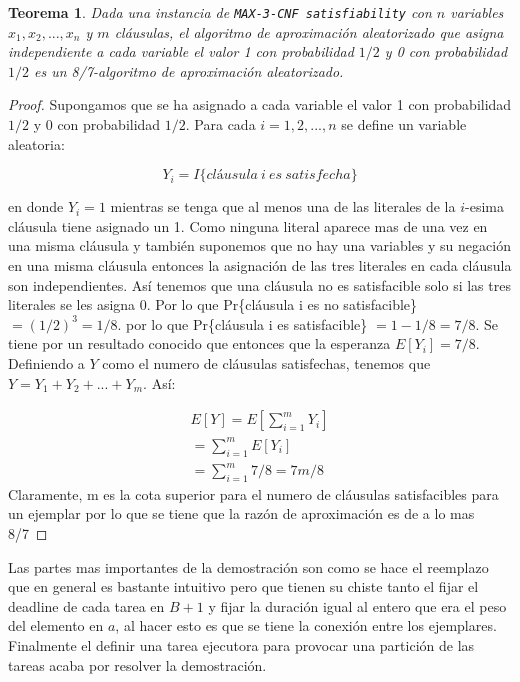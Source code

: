 \documentclass{article}
\newtheorem{theorem}{Teorema}
\begin{document}
\begin{theorem}
  Dada una instancia de \texttt{MAX-3-CNF satisfiability} con $n$ variables $x_1, x_2, ..., x_n$ y $m$ cláusulas, el algoritmo de aproximación aleatorizado que asigna independiente a cada variable el valor 1 con probabilidad $1/2$ y 0 con probabilidad $1/2$ es un 8/7-algoritmo de aproximación aleatorizado.
\end{theorem}
\begin{proof}
  Supongamos que se ha asignado a cada variable el valor 1 con probabilidad $1/2$ y 0 con probabilidad $1/2$. Para cada $i = 1, 2, ..., n$ se define un variable aleatoria:

  \begin{equation*}
    Y_i = I \{ cláusula\ i\ es\ satisfecha \}
  \end{equation*}

  en donde $Y_i = 1$ mientras se tenga que al menos una de las literales de la $i$-esima cláusula tiene asignado un 1. Como ninguna literal aparece mas de una vez en una misma cláusula y también suponemos que no hay una variables y su negación en una misma cláusula entonces la asignación de las tres literales en cada cláusula son independientes. Así tenemos que una cláusula no es satisfacible solo si las tres literales se les asigna 0. Por lo que Pr\{cláusula i es no satisfacible\} $= (1/2)^3 = 1/8 $. por lo que Pr\{cláusula i es satisfacible\} $= 1 - 1/8 = 7/8$. Se tiene por un resultado conocido que entonces que la esperanza $E[Y_i] = 7/8$. Definiendo a $Y$ como el numero de cláusulas satisfechas, tenemos que $Y = Y_1 + Y_2 + ... + Y_m$. Así:

  \begin{eqnarray}
      E[Y] = E[\sum_{i=1}^{m} Y_i] \\
      = \sum_{i=1}^{m} E[Y_i] \\
      = \sum_{i=1}^{m} 7/8
      = 7m/8
  \end{eqnarray}
Claramente, m es la cota superior para el numero de cláusulas satisfacibles para un ejemplar por lo que se tiene que la razón de aproximación es de a lo mas 8/7
\end{proof}

Las partes mas importantes de la demostración son como se hace el reemplazo que en general es bastante intuitivo pero que tienen su chiste tanto el fijar el deadline de cada tarea en $B + 1$ y fijar la duración igual al entero que era el peso del elemento en $a$, al hacer esto es que se tiene la conexión entre los ejemplares. Finalmente el definir una tarea ejecutora para provocar una partición de las tareas acaba por resolver la demostración.
\end{document}
